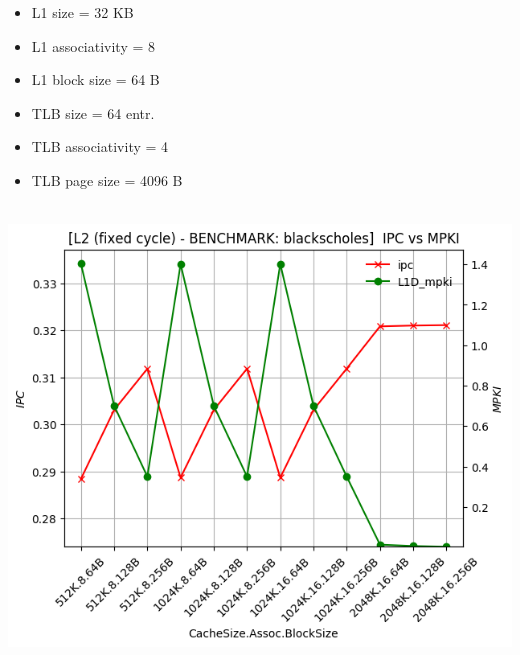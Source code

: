 \begin{multicols}{2}
    \begin{itemize}
        \item L1 size = 32 KB  
        \item L1 associativity = 8
        \item L1 block size = 64 B
        \item TLB size = 64 entr.
        \item TLB associativity = 4
        \item TLB page size = 4096 B
    \end{itemize}
\end{multicols}

\begin{minipage}{\textwidth}
    \begin{center}
        \\
        \vspace{3mm}
        \includegraphics[scale=0.70]{graphs/L2/fixed/blackscholes.png}
        \vspace{6mm}
    \end{center}
\end{minipage}


